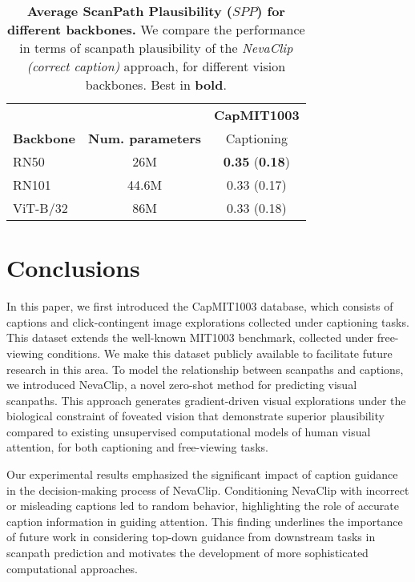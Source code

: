 \documentclass{article}
\begin{document}
\begin{table}[t]
\setlength{\abovecaptionskip}{5pt}
    \caption{\textbf{Average ScanPath Plausibility ($SPP$) for different backbones.} We compare the performance in terms of scanpath plausibility of the \textit{NevaClip (correct caption)} approach, for different vision backbones. Best in \textbf{bold}.}\label{tab:backbones}
    \centering
    \begin{tabular}{lcc}
    \hline
    \textbf{} & \textbf{} &  \textbf{CapMIT1003}  \\
    \textbf{Backbone} & \textbf{Num. parameters} & Captioning  \\
    \hline
    \hline
    RN50 \citep{radford2021learning} & 26M & \textbf{0.35} (\textbf{0.18})  \\
    RN101 \citep{radford2021learning} & 44.6M & 0.33 (0.17) \\
    ViT-B/32 \citep{radford2021learning} & 86M & 0.33 (0.18) \\
    \hline
    \end{tabular}

\end{table}


\section{Conclusions}

In this paper, we first introduced the CapMIT1003 database, which consists of captions and click-contingent image explorations collected under captioning tasks. This dataset extends the well-known MIT1003 benchmark, collected under free-viewing conditions. We make this dataset publicly available to facilitate future research in this area. To model the relationship between scanpaths and captions, we introduced NevaClip, a novel zero-shot method for predicting visual scanpaths. This approach generates gradient-driven visual explorations under the biological constraint of foveated vision that demonstrate superior plausibility compared to existing unsupervised computational models of human visual attention, for both captioning and free-viewing tasks.


Our experimental results emphasized the significant impact of caption guidance in the decision-making process of NevaClip. Conditioning NevaClip with incorrect or misleading captions led to random behavior, highlighting the role of accurate caption information in guiding attention. This finding underlines the importance of future work in considering top-down guidance from downstream tasks in scanpath prediction and motivates the development of more sophisticated computational approaches.
\end{document}
